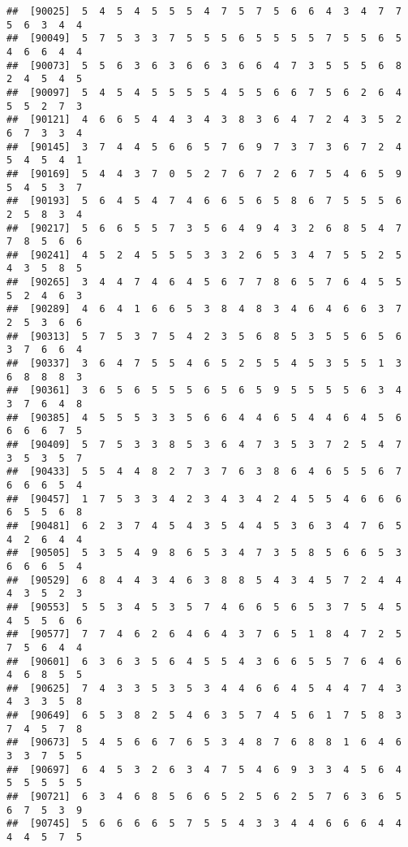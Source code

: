 \documentclass[
]{book}
\begin{document}
\begin{verbatim}
##  [90025]  5  4  5  4  5  5  5  4  7  5  7  5  6  6  4  3  4  7  7  5  6  3  4  4
##  [90049]  5  7  5  3  3  7  5  5  5  6  5  5  5  5  7  5  5  6  5  4  6  6  4  4
##  [90073]  5  5  6  3  6  3  6  6  3  6  6  4  7  3  5  5  5  6  8  2  4  5  4  5
##  [90097]  5  4  5  4  5  5  5  5  4  5  5  6  6  7  5  6  2  6  4  5  5  2  7  3
##  [90121]  4  6  6  5  4  4  3  4  3  8  3  6  4  7  2  4  3  5  2  6  7  3  3  4
##  [90145]  3  7  4  4  5  6  6  5  7  6  9  7  3  7  3  6  7  2  4  5  4  5  4  1
##  [90169]  5  4  4  3  7  0  5  2  7  6  7  2  6  7  5  4  6  5  9  5  4  5  3  7
##  [90193]  5  6  4  5  4  7  4  6  6  5  6  5  8  6  7  5  5  5  6  2  5  8  3  4
##  [90217]  5  6  6  5  5  7  3  5  6  4  9  4  3  2  6  8  5  4  7  7  8  5  6  6
##  [90241]  4  5  2  4  5  5  5  3  3  2  6  5  3  4  7  5  5  2  5  4  3  5  8  5
##  [90265]  3  4  4  7  4  6  4  5  6  7  7  8  6  5  7  6  4  5  5  5  2  4  6  3
##  [90289]  4  6  4  1  6  6  5  3  8  4  8  3  4  6  4  6  6  3  7  2  5  3  6  6
##  [90313]  5  7  5  3  7  5  4  2  3  5  6  8  5  3  5  5  6  5  6  3  7  6  6  4
##  [90337]  3  6  4  7  5  5  4  6  5  2  5  5  4  5  3  5  5  1  3  6  8  8  8  3
##  [90361]  3  6  5  6  5  5  5  6  5  6  5  9  5  5  5  5  6  3  4  3  7  6  4  8
##  [90385]  4  5  5  5  3  3  5  6  6  4  4  6  5  4  4  6  4  5  6  6  6  6  7  5
##  [90409]  5  7  5  3  3  8  5  3  6  4  7  3  5  3  7  2  5  4  7  3  5  3  5  7
##  [90433]  5  5  4  4  8  2  7  3  7  6  3  8  6  4  6  5  5  6  7  6  6  6  5  4
##  [90457]  1  7  5  3  3  4  2  3  4  3  4  2  4  5  5  4  6  6  6  6  5  5  6  8
##  [90481]  6  2  3  7  4  5  4  3  5  4  4  5  3  6  3  4  7  6  5  4  2  6  4  4
##  [90505]  5  3  5  4  9  8  6  5  3  4  7  3  5  8  5  6  6  5  3  6  6  6  5  4
##  [90529]  6  8  4  4  3  4  6  3  8  8  5  4  3  4  5  7  2  4  4  4  3  5  2  3
##  [90553]  5  5  3  4  5  3  5  7  4  6  6  5  6  5  3  7  5  4  5  4  5  5  6  6
##  [90577]  7  7  4  6  2  6  4  6  4  3  7  6  5  1  8  4  7  2  5  7  5  6  4  4
##  [90601]  6  3  6  3  5  6  4  5  5  4  3  6  6  5  5  7  6  4  6  4  6  8  5  5
##  [90625]  7  4  3  3  5  3  5  3  4  4  6  6  4  5  4  4  7  4  3  4  3  3  5  8
##  [90649]  6  5  3  8  2  5  4  6  3  5  7  4  5  6  1  7  5  8  3  7  4  5  7  8
##  [90673]  5  4  5  6  6  7  6  5  3  4  8  7  6  8  8  1  6  4  6  3  3  7  5  5
##  [90697]  6  4  5  3  2  6  3  4  7  5  4  6  9  3  3  4  5  6  4  5  5  5  5  5
##  [90721]  6  3  4  6  8  5  6  6  5  2  5  6  2  5  7  6  3  6  5  6  7  5  3  9
##  [90745]  5  6  6  6  6  5  7  5  5  4  3  3  4  4  6  6  6  4  4  4  4  5  7  5

\end{verbatim}
\end{document}
